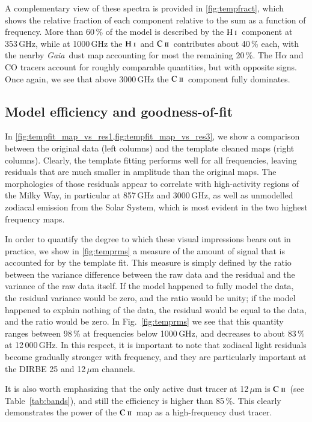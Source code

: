 \documentclass{aa}
\newcommand{\mathsc}[1]{{\normalfont\textsc{#1}}}
\def\Gaia{\textit{Gaia}}
\newcommand{\CII}{\ensuremath{\mathsc{C\ ii}}}
\newcommand{\HI}{\ensuremath{\mathsc{H\ i}}}
\begin{document}
A complementary view of these spectra is provided in
\cref{fig:tempfract}, which shows the relative fraction of each
component relative to the sum as a function of frequency. More than
60\,\% of the model is described by the \HI\ component at 353\,GHz,
while at 1000\,GHz the \HI\ and \CII\ contributes about 40\,\% each,
with the nearby \Gaia\ dust map accounting for most the remaining
20\,\%. The H$\alpha$ and CO tracers account for roughly comparable
quantities, but with opposite signs. Once again, we see that above
3000\,GHz the \CII\ component fully dominates.

\subsection{Model efficiency and goodness-of-fit}
\label{sec:residuals}
In
\cref{fig:tempfit_map_vs_res1,fig:tempfit_map_vs_res3},
we show a comparison between the original data (left columns) and the
template cleaned maps (right columns). Clearly, the template fitting
performs well for all frequencies, leaving residuals that are much
smaller in amplitude than the original maps. The morphologies of those
residuals appear to correlate with high-activity regions of the Milky
Way, in particular at 857\,GHz and 3000\,GHz, as well as unmodelled
zodiacal emission from the Solar System, which is most evident in the
two highest frequency maps.

In order to quantify the degree to which these visual impressions
bears out in practice, we show in \cref{fig:temprms} a measure of the
amount of signal that is accounted for by the template fit. This
measure is simply defined by the ratio between the variance difference
between the raw data and the residual and the variance of the raw data
itself. If the model happened to fully model the data, the residual
variance would be zero, and the ratio would be unity; if the model
happened to explain nothing of the data, the residual would be equal
to the data, and the ratio would be zero. In Fig.~\ref{fig:temprms} we
see that this quantity ranges between 98\,\% at frequencies below
1000\,GHz, and decreases to about 83\,\% at 12\,000\,GHz. In this
respect, it is important to note that zodiacal light residuals become
gradually stronger with frequency, and they are particularly important
at the DIRBE 25 and 12\,$\mu$m channels.

It is also worth emphasizing that the only active dust tracer at
12\,$\mu$m is \CII\ (see Table~\ref{tab:bands}), and still the
efficiency is higher than 85\,\%. This clearly demonstrates the
power of the \CII\ map as a high-frequency dust tracer. 
\end{document}
